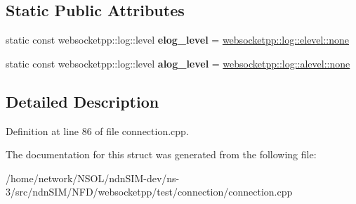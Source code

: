 \subsection*{Static Public Attributes}
\begin{DoxyCompactItemize}
\item 
static const websocketpp\+::log\+::level {\bfseries elog\+\_\+level} = \hyperlink{structwebsocketpp_1_1log_1_1elevel_ae86395aa26ec2089e07fd63b62a549fa}{websocketpp\+::log\+::elevel\+::none}\hypertarget{structdebug__config__client_a79da8f2fa51e626728ca1e2dcadb18d2}{}\label{structdebug__config__client_a79da8f2fa51e626728ca1e2dcadb18d2}

\item 
static const websocketpp\+::log\+::level {\bfseries alog\+\_\+level} = \hyperlink{structwebsocketpp_1_1log_1_1alevel_a4cf0520816094999975fe73081cf30f2}{websocketpp\+::log\+::alevel\+::none}\hypertarget{structdebug__config__client_ae175641f2ff19749ea3fafd1ff29919b}{}\label{structdebug__config__client_ae175641f2ff19749ea3fafd1ff29919b}

\end{DoxyCompactItemize}


\subsection{Detailed Description}


Definition at line 86 of file connection.\+cpp.



The documentation for this struct was generated from the following file\+:\begin{DoxyCompactItemize}
\item 
/home/network/\+N\+S\+O\+L/ndn\+S\+I\+M-\/dev/ns-\/3/src/ndn\+S\+I\+M/\+N\+F\+D/websocketpp/test/connection/connection.\+cpp\end{DoxyCompactItemize}
